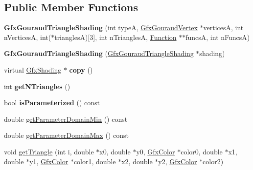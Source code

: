\subsection*{Public Member Functions}
\begin{DoxyCompactItemize}
\item 
\mbox{\label{class_gfx_gouraud_triangle_shading_abaaecbcf27dd33ea66b5421f7e28cd68}} 
{\bfseries Gfx\+Gouraud\+Triangle\+Shading} (int typeA, \hyperlink{struct_gfx_gouraud_vertex}{Gfx\+Gouraud\+Vertex} $\ast$verticesA, int n\+VerticesA, int($\ast$trianglesA)\mbox{[}3\mbox{]}, int n\+TrianglesA, \hyperlink{class_function}{Function} $\ast$$\ast$funcsA, int n\+FuncsA)
\item 
\mbox{\label{class_gfx_gouraud_triangle_shading_a33f2b64475b8e0bdf97e174f885ee0ce}} 
{\bfseries Gfx\+Gouraud\+Triangle\+Shading} (\hyperlink{class_gfx_gouraud_triangle_shading}{Gfx\+Gouraud\+Triangle\+Shading} $\ast$shading)
\item 
\mbox{\label{class_gfx_gouraud_triangle_shading_a9c2d280edb6649f4dc23ea0bd22675ff}} 
virtual \hyperlink{class_gfx_shading}{Gfx\+Shading} $\ast$ {\bfseries copy} ()
\item 
\mbox{\label{class_gfx_gouraud_triangle_shading_a41e2ce7d699fb711070155d3e40b31bc}} 
int {\bfseries get\+N\+Triangles} ()
\item 
\mbox{\label{class_gfx_gouraud_triangle_shading_ab39feb4dee3dc8c4528eebe5a9d90ca4}} 
bool {\bfseries is\+Parameterized} () const
\item 
double \hyperlink{class_gfx_gouraud_triangle_shading_a702b7864620fa2b509f58354343653c2}{get\+Parameter\+Domain\+Min} () const
\item 
double \hyperlink{class_gfx_gouraud_triangle_shading_afde54962e071a49f42ebbd0b7a33393e}{get\+Parameter\+Domain\+Max} () const
\item 
void \hyperlink{class_gfx_gouraud_triangle_shading_ae22356d46b989547db9dbb247ed34bad}{get\+Triangle} (int i, double $\ast$x0, double $\ast$y0, \hyperlink{struct_gfx_color}{Gfx\+Color} $\ast$color0, double $\ast$x1, double $\ast$y1, \hyperlink{struct_gfx_color}{Gfx\+Color} $\ast$color1, double $\ast$x2, double $\ast$y2, \hyperlink{struct_gfx_color}{Gfx\+Color} $\ast$color2)
$$
\end{DoxyCompactItemize}
